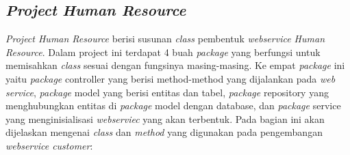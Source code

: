 \subsection{\textit{Project} \textit{Human Resource}}
\textit{Project Human Resource} berisi susunan \textit{class} pembentuk \textit{webservice Human Resource}. Dalam project ini terdapat 4 buah \textit{package} yang berfungsi untuk memisahkan \textit{class} sesuai dengan fungsinya masing-masing. Ke empat \textit{package} ini yaitu \textit{package} controller yang berisi method-method yang dijalankan pada \textit{web service}, \textit{package} model yang berisi entitas dan tabel, \textit{package} repository yang menghubungkan entitas di \textit{package} model dengan database, dan \textit{package} service yang menginisialisasi \textit{webserviec} yang akan terbentuk. Pada bagian ini akan dijelaskan mengenai \textit{class} dan \textit{method} yang digunakan pada pengembangan \textit{ webservice customer}:
